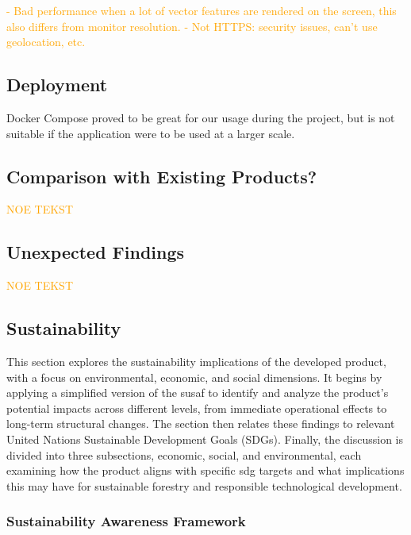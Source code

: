 \textcolor{orange}{- Bad performance when a lot of vector features are rendered on the screen, this also differs from monitor resolution. - Not HTTPS: security issues, can't use geolocation, etc.}

\subsection{Deployment}%

Docker Compose proved to be great for our usage during the project, but is not suitable if the application were to be used at a larger scale.

\subsection{Comparison with Existing Products?}

\textcolor{orange}{NOE TEKST}

\subsection{Unexpected Findings} %

\textcolor{orange}{NOE TEKST}

\subsection{Sustainability}\label{subsec:discussion:product:sustainability}

This section explores the sustainability implications of the developed product, with a focus on environmental, economic, and social dimensions. It begins by applying a simplified version of the \acrfull{susaf} to identify and analyze the product's potential impacts across different levels, from immediate operational effects to long-term structural changes. The section then relates these findings to relevant United Nations Sustainable Development Goals (SDGs). Finally, the discussion is divided into three subsections, economic, social, and environmental, each examining how the product aligns with specific \acrshort{sdg} targets and what implications this may have for sustainable forestry and responsible technological development.

\subsubsection{Sustainability Awareness Framework}\label{subsubsec:discussion:product:sustainability:susaf}

